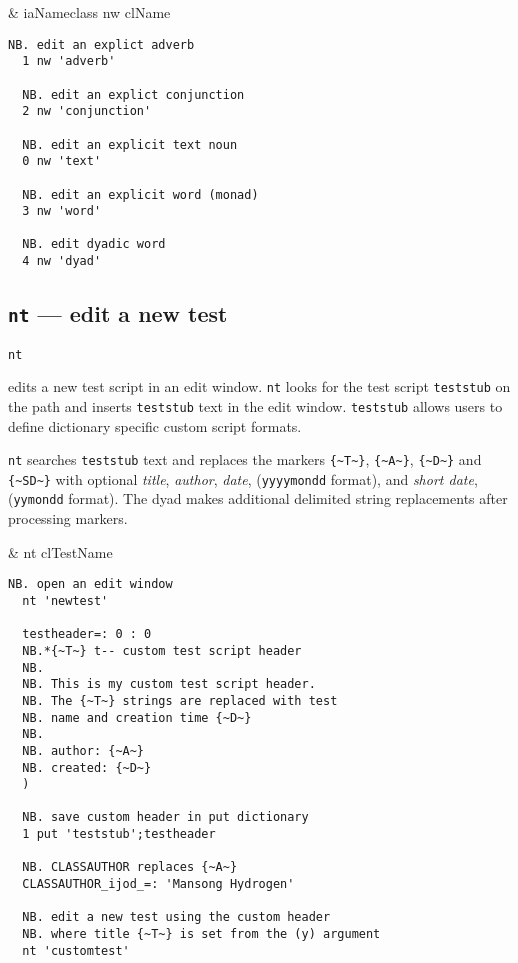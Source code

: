 \begin{wordhead}
\dyad & iaNameclass nw clName \\
\end{wordhead}
\begin{lstlisting}[frame=single,framerule=0pt]
  NB. edit an explict adverb
  1 nw 'adverb'   

  NB. edit an explict conjunction
  2 nw 'conjunction'  

  NB. edit an explicit text noun
  0 nw 'text'  

  NB. edit an explicit word (monad)
  3 nw 'word'  

  NB. edit dyadic word
  4 nw 'dyad'  
\end{lstlisting}

\subsection{\texttt{nt} --- edit a new test}\label{ss:nt}

\hypertarget{il:nt}{\texttt{nt}} edits a new test script in an edit window. 
\texttt{nt} looks for the test script \texttt{teststub} on the path and inserts 
\texttt{teststub} text in the edit window. \texttt{teststub} allows users to define dictionary specific
custom script formats.

\texttt{nt} searches \texttt{teststub} text and replaces the markers
\verb|{~T~}|, \verb|{~A~}|, \verb|{~D~}| and \verb|{~SD~}| with optional
\emph{title}, \emph{author}, \emph{date}, (\texttt{yyyymondd} format), and 
\emph{short date}, (\texttt{yymondd} format). The dyad makes additional 
delimited string replacements after processing
markers.

\begin{wordhead}
\monad & nt clTestName \\
\end{wordhead}
\begin{lstlisting}[frame=single,framerule=0pt] 
  NB. open an edit window
  nt 'newtest'  

  testheader=: 0 : 0
  NB.*{~T~} t-- custom test script header
  NB. 
  NB. This is my custom test script header.
  NB. The {~T~} strings are replaced with test
  NB. name and creation time {~D~}
  NB.
  NB. author: {~A~}
  NB. created: {~D~}
  ) 

  NB. save custom header in put dictionary
  1 put 'teststub';testheader
  
  NB. CLASSAUTHOR replaces {~A~}
  CLASSAUTHOR_ijod_=: 'Mansong Hydrogen'

  NB. edit a new test using the custom header
  NB. where title {~T~} is set from the (y) argument
  nt 'customtest'
\end{lstlisting}

